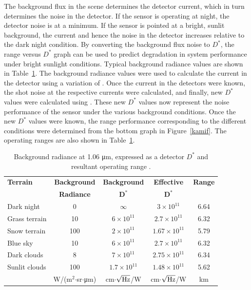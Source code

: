 The background flux in the scene determines the detector current, which in turn determines  the noise in the detector. If the sensor is operating at night, the detector noise is at a minimum. If the sensor is pointed at a bright, sunlit background, the current and hence the noise in the detector increases relative to the dark night condition.  By converting the background flux noise to $D^\ast$, the range versus $D^\ast$ graph can be used to predict degradation in system performance under bright sunlight conditions.  Typical background radiance values are shown in Table~\ref{tab:rangefinderperformance}. The background radiance values were used to calculate the current in the detector using a variation of .  Once the current in the detectors were known, the shot noise at the respective currents were calculated, and finally, new $D^\ast$ values were calculated using .  These new $D^\ast$ values now represent the noise performance of the sensor under the various background conditions. Once the new $D^\ast$ values were known, the range performance corresponding to the different conditions were determined from the bottom graph in Figure~\ref{kamif}.  The operating ranges are also shown in Table~\ref{tab:rangefinderperformance}.


\begin{table}[tb]
\centering
\caption{Background radiance at 1.06 \si{\micro\metre}{}, expressed as a detector $D^\ast$ and resultant operating range \cite{Kaminski1980}.\label{tab:rangefinderperformance}}
\begin{tabular}{|l|c|c|c|c|}
\hline
\textbf{Terrain} & \textbf{Background} & \textbf{Background} & \textbf{Effective} & \textbf{Range} \\
         & \textbf{Radiance} &$\bm{D^\ast}$&$\bm{D^\ast}$ & \\
\hline
Dark night   & 0    & $\infty$               & $3\times10^{11}$ &6.64 \\
Grass terrain & 10 & $6\times10^{11}$ &$2.7\times10^{11}$ & 6.32\\
Snow terrain & 100 &$2\times10^{11}$ &$1.67\times10^{11}$ &5.79 \\
\hline
Blue sky & 10 &$6\times10^{11}$ &$2.7\times10^{11}$ & 6.32\\
Dark clouds & 8 &$7\times10^{11}$ &$2.75\times10^{11}$  &6.34 \\
Sunlit clouds & 100 & $1.7\times10^{11}$ &$1.48\times10^{11}$ &5.62 \\
\hline
& W/(m$^2$$\cdot$sr$\cdot$\si{\micro\metre}{}) & cm$\cdot$$\sqrt{\rm Hz}$/W & cm$\cdot$$\sqrt{\rm Hz}$/W  & km\colheightrule\\
\hline
\end{tabular}
\end{table}

